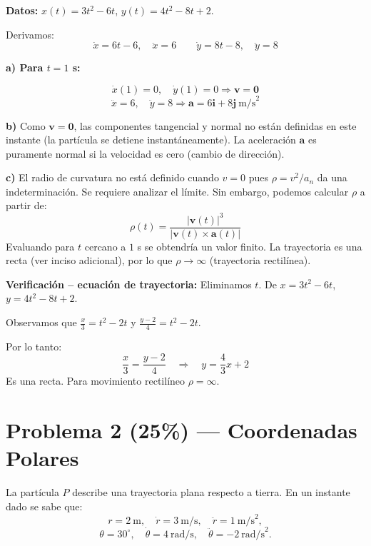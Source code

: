 \documentclass[12pt,a4paper]{article}
\begin{document}
\begin{solbox}
\textbf{Datos:} $x(t) = 3t^2 - 6t$, $y(t) = 4t^2 - 8t + 2$.

Derivamos:
\[
\dot{x} = 6t - 6, \quad \ddot{x} = 6
\qquad
\dot{y} = 8t - 8, \quad \ddot{y} = 8
\]

\textbf{a) Para $t = 1$ s:}

\[
\dot{x}(1) = 0,\quad \dot{y}(1) = 0 \Rightarrow \mathbf{v} = \mathbf{0}
\]
\[
\ddot{x} = 6,\quad \ddot{y} = 8 \Rightarrow \mathbf{a} = 6\mathbf{i} + 8\mathbf{j} \ \text{m/s}^2
\]

\textbf{b)} Como $\mathbf{v} = \mathbf{0}$, las componentes tangencial y normal no están
definidas en este instante (la partícula se detiene instantáneamente).
La aceleración $\mathbf{a}$ es puramente normal si la velocidad es cero
(cambio de dirección).

\textbf{c)} El radio de curvatura no está definido cuando $v=0$ pues $\rho = v^2/a_n$
da una indeterminación. Se requiere analizar el límite. Sin embargo,
podemos calcular $\rho$ a partir de:
\[
\rho(t) = \frac{|\mathbf{v}(t)|^3}{|\mathbf{v}(t) \times \mathbf{a}(t)|}
\]
Evaluando para $t$ cercano a $1$ s se obtendría un valor finito.
La trayectoria es una recta (ver inciso adicional), por lo que
$\rho \to \infty$ (trayectoria rectilínea).

\smallskip
\textbf{Verificación -- ecuación de trayectoria:}
Eliminamos $t$. De $x = 3t^2 - 6t$, $y = 4t^2 - 8t + 2$.

Observamos que $\frac{x}{3} = t^2 - 2t$ y $\frac{y-2}{4} = t^2 - 2t$.

Por lo tanto:
\[
\frac{x}{3} = \frac{y-2}{4} \quad\Rightarrow\quad y = \frac{4}{3}x + 2
\]
Es una recta. Para movimiento rectilíneo $\rho = \infty$.
\end{solbox}

\newpage

\section*{Problema 2 (25\%) --- Coordenadas Polares}

La partícula $P$ describe una trayectoria plana respecto a tierra. En un
instante dado se sabe que:
\[
r = 2\ \text{m},\quad \dot{r} = 3\ \text{m/s},\quad \ddot{r} = 1\ \text{m/s}^2,
\]
\[
\theta = 30^\circ,\quad \dot{\theta} = 4\ \text{rad/s},\quad \ddot{\theta} = -2\ \text{rad/s}^2.
\]
\end{document}
